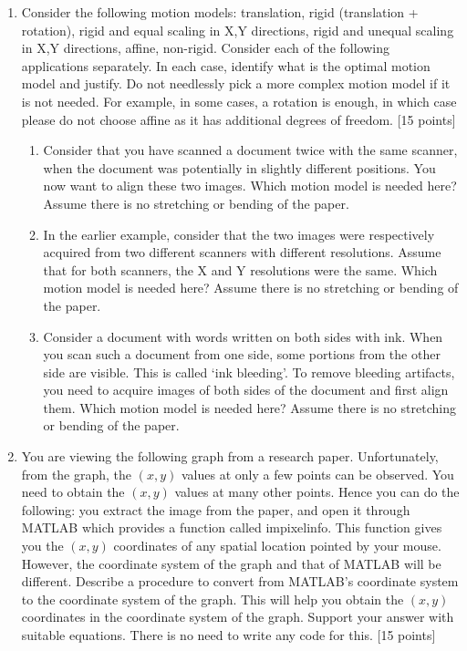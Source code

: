 \documentclass[11pt]{article}
\begin{document}
\begin{enumerate}
\item Consider the following motion models: translation, rigid (translation + rotation), rigid and equal scaling in X,Y directions, rigid and unequal scaling in X,Y directions, affine, non-rigid. Consider each of the following applications separately. In each case, identify what is the optimal motion model and justify. Do not needlessly pick a more complex motion model if it is not needed. For example, in some cases, a rotation is enough, in which case please do not choose affine as it has additional degrees of freedom. \textsf{[15 points]}
\begin{enumerate}
\item Consider that you have scanned a document twice with the same scanner, when the document was potentially in slightly different positions. You now want to align these two images. Which motion model is needed here? Assume there is no stretching or bending of the paper.
\item In the earlier example, consider that the two images were respectively acquired from two different scanners with different resolutions. Assume that for both scanners, the X and Y resolutions were the same. Which motion model is needed here? Assume there is no stretching or bending of the paper.
\item Consider a document with words written on both sides with ink. When you scan such a document from one side, some portions from the other side are visible. This is called `ink bleeding'. To remove bleeding artifacts, you need to acquire images of both sides of the document and first align them. Which motion model is needed here? Assume there is no stretching or bending of the paper.
\end{enumerate}

\item You are viewing the following graph from a research paper. Unfortunately, from the graph, the $(x,y)$ values at only a few points can be observed. You need to obtain the $(x,y)$ values at many other points. Hence you can do the following: you extract the image from the paper, and open it through MATLAB which provides a function called impixelinfo. This function gives you the $(x,y)$ coordinates of any spatial location pointed by your mouse. However, the coordinate system of the graph and that of MATLAB will be different. Describe a procedure to convert from MATLAB's coordinate system to the coordinate system of the graph. This will help you obtain the $(x,y)$ coordinates in the coordinate system of the graph. Support your answer with suitable equations. There is no need to write any code for this. \textsf{[15 points]}


\end{enumerate}
\end{document}
